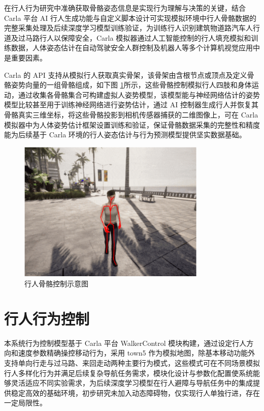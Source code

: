 在行人行为研究中准确获取骨骼姿态信息是实现行为理解与决策的关键，结合 Carla 平台 AI 行人生成功能与自定义脚本设计可实现模拟环境中行人骨骼数据的完整采集处理及后续深度学习模型训练验证，为训练行人识别建筑物道路汽车人行道及过马路行人以保障安全，Carla 模拟器通过人工智能控制的行人填充模拟和训练数据，人体姿态估计在自动驾驶安全人群控制及机器人等多个计算机视觉应用中是重要因素。

Carla 的 API 支持从模拟行人获取真实骨架，该骨架由含根节点或顶点及定义骨骼姿势向量的一组骨骼组成，如下图 \ref{fig:pedestrian_skeleton}所示，这些骨骼控制模拟行人四肢和身体运动，通过收集各骨骼集合可构建虚拟人姿势模型，该模型能与神经网络估计的姿势模型比较甚至用于训练神经网络进行姿势估计，通过 AI 控制器生成行人并恢复其骨骼真实三维坐标，将这些骨骼投影到相机传感器捕获的二维图像上，可在 Carla 模拟器中为人体姿势估计框架设置训练和验证，保证骨骼数据采集的完整性和精度能为后续基于 Carla 环境的行人姿态估计与行为预测模型提供坚实数据基础。

\begin{figure}[H]
    \centering
    \includegraphics[width=0.8\textwidth]{images/pedestrian_skeleton.pdf}
    \caption{行人骨骼控制示意图}
    \label{fig:pedestrian_skeleton}
\end{figure}

\section{行人行为控制}
本系统行为控制模型基于 Carla 平台 WalkerControl 模块构建，通过设定行人方向和速度参数精确操控移动行为，采用 town5 作为模拟地图，除基本移动功能外支持单向行走与过马路、来回走动两种主要行为模式，这些模式可在不同场景模拟行人多样化行为并满足后续复杂导航任务需求，模块化设计与参数化配置使系统能够灵活适应不同实验需求，为后续深度学习模型在行人避障与导航任务中的集成提供稳定高效的基础环境，初步研究未加入动态障碍物，仅实现行人单独行进，存在一定局限性。

